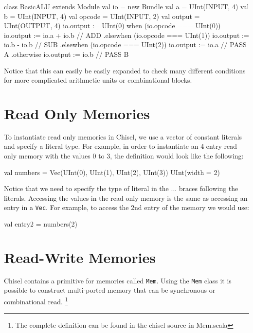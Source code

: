 \begin{scala}
class BasicALU extends Module {
  val io = new Bundle {
    val a      = UInt(INPUT, 4)
    val b      = UInt(INPUT, 4)
    val opcode = UInt(INPUT, 2)
    val output = UInt(OUTPUT, 4)
  }
  io.output := UInt(0) 
  when (io.opcode === UInt(0)) {
    io.output := io.a + io.b   // ADD
  } .elsewhen (io.opcode === UInt(1)) {
    io.output := io.b - io.b   // SUB
  } .elsewhen (io.opcode === UInt(2)) {
    io.output := io.a  	       // PASS A
  } .otherwise {
    io.output := io.b          // PASS B
  }
}
\end{scala}

Notice that this can easily be easily expanded to check many different conditions for more complicated arithmetic units or combinational blocks.

\section{Read Only Memories}

To instantiate read only memories in Chisel, we use a vector of constant literals and specify a literal type. For example, in order to instantiate an 4 entry read only memory with the values 0 to 3, the definition would look like the following:

\begin{footnotesize}
\begin{scala}
val numbers = 
  Vec(UInt(0), UInt(1), UInt(2), UInt(3)){ UInt(width = 2) }
\end{scala}
\end{footnotesize}

Notice that we need to specify the type of literal in the {...} braces following the literals. Accessing the values in the read only memory is the same as accessing an entry in a \verb+Vec+. For example, to access the 2nd entry of the memory we would use:

\begin{scala}
val entry2 = numbers(2)
\end{scala}

\section{Read-Write Memories}

Chisel contains a primitive for memories called \verb+Mem+. Using the \verb+Mem+ class it is possible to construct multi-ported memory that can be synchronous or combinational read. \footnote{The complete definition can be found in the chisel source in  Mem.scala}

